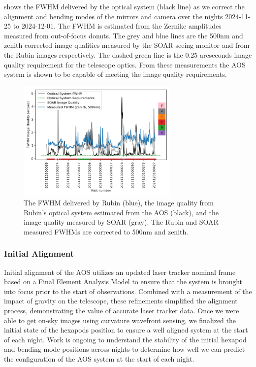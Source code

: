  shows the FWHM delivered by the optical system (black line) as we correct the alignment
and bending modes of the mirrors and camera over the nights 2024-11-25 to 2024-12-01. The FWHM is estimated
from the Zernike amplitudes measured from out-of-focus donuts. The grey and blue lines are the 500nm and
zenith corrected image qualities measured by the SOAR \RINGSS seeing monitor and from the Rubin images
respectively. The dashed green line is the 0.25 arcseconds image quality requirement for the telescope
optics. From these measurements the AOS system is shown to be capable of meeting the image quality requirements.

\begin{figure}
    \centering \includegraphics[width=0.7\textwidth]{figures/optical_performance.png}
    \caption{The FWHM delivered by Rubin (blue), the image quality from Rubin's optical system estimated from the AOS (black), and the  image quality measured by SOAR (gray). The Rubin and SOAR measured FWHMs are corrected to 500nm and zenith.}
    \label{fig:aos}
\end{figure}


\subsubsection{Initial Alignment}
Initial alignment of the AOS utilizes an updated laser tracker nominal frame based on a Final Element Analysis
Model to ensure that the system is brought into focus prior to the start of observations.  Combined with a
measurement of the impact of gravity on the telescope, these refinements simplified the alignment process,
demonstrating the value of accurate laser tracker data. Once we were able to get on-sky images using curvature
wavefront sensing, we finalized the initial state of the hexapods position to ensure a well aligned system at
the start of each night. Work is ongoing to understand the stability of the initial hexapod and bending mode positions across nights to determine how well we can predict the  configuration of the AOS system at the start of each night. 


